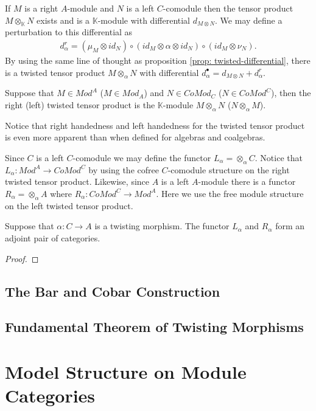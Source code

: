 \documentclass[../thesis.tex]{subfiles}
\begin{document}
            If $M$ is a right $A$-module and $N$ is a left $C$-comodule then the tensor product $M\otimes_\mathbb{K} N$ exists and is a $\mathbb{K}$-module with differential $d_{M\otimes N}$. We may define a perturbation to this differential as 
            \begin{align*}
                d_\alpha^r = (\mu_M\otimes id_N) \circ (id_M \otimes \alpha \otimes id_N) \circ (id_M \otimes \nu_N).
            \end{align*}
            By using the same line of thought as proposition \ref{prop: twisted-differential}, there is a twisted tensor product $M\otimes_\alpha N$ with differential $d_\alpha^\bullet = d_{M\otimes N} + d_\alpha^r$.
            
            \begin{definition}
                Suppose that $M\in Mod^A$ ($M\in Mod_A$) and $N\in CoMod_C$ ($N\in CoMod^C$), then the right (left) twisted tensor product is the $\mathbb{K}$-module $M\otimes_\alpha N$ ($N\otimes_\alpha M$).
            \end{definition}

            Notice that right handedness and left handedness for the twisted tensor product is even more apparent than when defined for algebras and coalgebras.

            Since $C$ is a left $C$-comodule we may define the functor $L_\alpha = \otimes_\alpha C$. Notice that $L_\alpha : Mod^A \rightarrow CoMod^C$ by using the cofree $C$-comodule structure on the right twisted tensor product. Likewise, since $A$ is a left $A$-module there is a functor $R_\alpha = \otimes_\alpha A$ where $R_\alpha : CoMod^C \rightarrow Mod^A$. Here we use the free module structure on the left twisted tensor product.

            \begin{proposition}
                Suppose that $\alpha : C \rightarrow A$ is a twisting morphism. The functor $L_\alpha$ and $R_\alpha$ form an adjoint pair of categories.
                \begin{center}
                \end{center}
            \end{proposition}

            \begin{proof}
                
            \end{proof}

        \subsection{The Bar and Cobar Construction}

        \subsection{Fundamental Theorem of Twisting Morphisms}

    \section{Model Structure on Module Categories}
\end{document}
